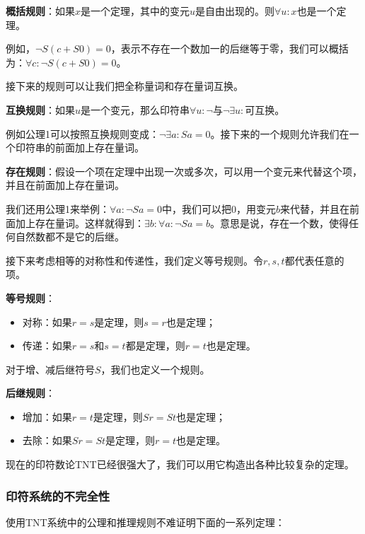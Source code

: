 \documentclass{article}
\begin{document}
\textbf{概括规则}：如果$x$是一个定理，其中的变元$u$是自由出现的。则$\forall u: x$也是一个定理。

例如，$\lnot S(c + S0) = 0$，表示不存在一个数加一的后继等于零，我们可以概括为：$\forall c: \lnot S(c + S0) = 0$。

接下来的规则可以让我们把全称量词和存在量词互换。

\textbf{互换规则}：如果$u$是一个变元，那么印符串$\forall u: \lnot $与$\lnot \exists u:$可互换。

例如公理1可以按照互换规则变成：$\lnot \exists a: Sa = 0$。接下来的一个规则允许我们在一个印符串的前面加上存在量词。

\textbf{存在规则}：假设一个项在定理中出现一次或多次，可以用一个变元来代替这个项，并且在前面加上存在量词。

我们还用公理1来举例：$\forall a: \lnot Sa = 0$中，我们可以把0，用变元$b$来代替，并且在前面加上存在量词。这样就得到：$\exists b: \forall a: \lnot Sa = b$。意思是说，存在一个数，使得任何自然数都不是它的后继。

接下来考虑相等的对称性和传递性，我们定义等号规则。令$r, s, t$都代表任意的项。

\textbf{等号规则}：
\begin{itemize}
\item 对称：如果$r = s$是定理，则$s = r$也是定理；
\item 传递：如果$r = s$和$s = t$都是定理，则$r = t$也是定理。
\end{itemize}

对于增、减后继符号$S$，我们也定义一个规则。

\textbf{后继规则}：
\begin{itemize}
\item 增加：如果$r = t$是定理，则$Sr = St$也是定理；
\item 去除：如果$Sr = St$是定理，则$r = t$也是定理。
\end{itemize}

现在的印符数论TNT已经很强大了，我们可以用它构造出各种比较复杂的定理。

\begin{Exercise}
\end{Exercise}

\subsubsection{印符系统的不完全性}

使用TNT系统中的公理和推理规则不难证明下面的一系列定理：
\end{document}
